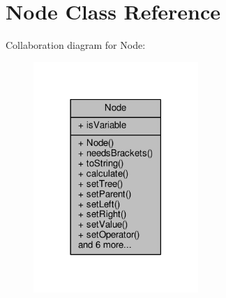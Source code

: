 \hypertarget{classNode}{}\section{Node Class Reference}
\label{classNode}


Collaboration diagram for Node\+:
\nopagebreak
\begin{figure}[H]
\begin{center}
\leavevmode
\includegraphics[width=177pt]{classNode__coll__graph}
\end{center}
\end{figure}

